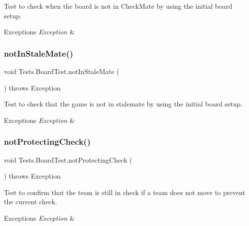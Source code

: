 Test to check when the board is not in Check\+Mate by using the initial board setup. 
\begin{DoxyExceptions}{Exceptions}
{\em Exception} & \\
\hline
\end{DoxyExceptions}
\hypertarget{class_tests_1_1_board_test_a403efc830e97a274bc65ea131dfb0e5f}{}\label{class_tests_1_1_board_test_a403efc830e97a274bc65ea131dfb0e5f} 
\subsubsection{\texorpdfstring{not\+In\+Stale\+Mate()}{notInStaleMate()}}
{\footnotesize\ttfamily void Tests.\+Board\+Test.\+not\+In\+Stale\+Mate (\begin{DoxyParamCaption}{ }\end{DoxyParamCaption}) throws Exception}

Test to check that the game is not in stalemate by using the initial board setup. 
\begin{DoxyExceptions}{Exceptions}
{\em Exception} & \\
\hline
\end{DoxyExceptions}
\hypertarget{class_tests_1_1_board_test_aa5b9e4cbefe4702bcd89fbc9ee886a29}{}\label{class_tests_1_1_board_test_aa5b9e4cbefe4702bcd89fbc9ee886a29} 
\subsubsection{\texorpdfstring{not\+Protecting\+Check()}{notProtectingCheck()}}
{\footnotesize\ttfamily void Tests.\+Board\+Test.\+not\+Protecting\+Check (\begin{DoxyParamCaption}{ }\end{DoxyParamCaption}) throws Exception}

Test to confirm that the team is still in check if a team does not move to prevent the current check. 
\begin{DoxyExceptions}{Exceptions}
{\em Exception} & \\
\hline
\end{DoxyExceptions}
\hypertarget{class_tests_1_1_board_test_a59084580ebe6a2c112887b13c1fa63ee}{}\label{class_tests_1_1_board_test_a59084580ebe6a2c112887b13c1fa63ee} 
